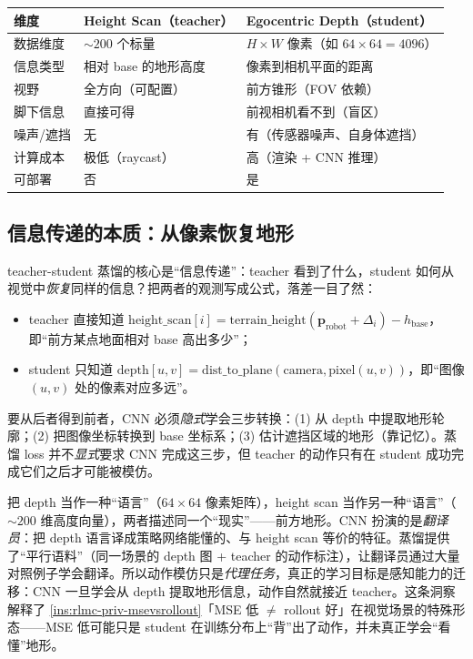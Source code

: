 \begin{center}
\small
\begin{tabular}{@{}lll@{}}
\toprule
维度 & Height Scan（teacher） & Egocentric Depth（student） \\
\midrule
数据维度 & $\sim 200$ 个标量 & $H\times W$ 像素（如 $64\times64=4096$） \\
信息类型 & 相对 base 的地形高度 & 像素到相机平面的距离 \\
视野 & 全方向（可配置） & 前方锥形（FOV 依赖） \\
脚下信息 & 直接可得 & 前视相机看不到（盲区） \\
噪声/遮挡 & 无 & 有（传感器噪声、自身体遮挡） \\
计算成本 & 极低（raycast） & 高（渲染 + CNN 推理） \\
可部署 & 否 & 是 \\
\bottomrule
\end{tabular}
\end{center}

\subsection{信息传递的本质：从像素恢复地形}
\label{sec:rlmc-vm-infotransfer}

teacher-student 蒸馏的核心是“信息传递”：teacher 看到了什么，student 如何从视觉中\emph{恢复}同样的信息？把两者的观测写成公式，落差一目了然：

\begin{itemize}
\item teacher 直接知道 $\text{height\_scan}[i] = \text{terrain\_height}(\mathbf{p}_{\text{robot}} + \Delta_i) - h_{\text{base}}$，即“前方某点地面相对 base 高出多少”；
\item student 只知道 $\text{depth}[u,v] = \text{dist\_to\_plane}(\text{camera}, \text{pixel}(u,v))$，即“图像 $(u,v)$ 处的像素对应多远”。
\end{itemize}

要从后者得到前者，CNN 必须\emph{隐式}学会三步转换：(1) 从 depth 中提取地形轮廓；(2) 把图像坐标转换到 base 坐标系；(3) 估计遮挡区域的地形（靠记忆）。蒸馏 loss 并不\emph{显式}要求 CNN 完成这三步，但 teacher 的动作只有在 student 成功完成它们之后才可能被模仿。

\begin{insight}\label{ins:rlmc-vm-perception}
把 depth 当作一种“语言”（$64\times64$ 像素矩阵），height scan 当作另一种“语言”（$\sim 200$ 维高度向量），两者描述同一个“现实”——前方地形。CNN 扮演的是\emph{翻译员}：把 depth 语言译成策略网络能懂的、与 height scan 等价的特征。蒸馏提供了“平行语料”（同一场景的 depth 图 + teacher 的动作标注），让翻译员通过大量对照例子学会翻译。所以动作模仿只是\emph{代理任务}，真正的学习目标是感知能力的迁移：CNN 一旦学会从 depth 提取地形信息，动作自然就接近 teacher。这条洞察解释了 \cref{ins:rlmc-priv-msevsrollout}「MSE 低 $\ne$ rollout 好」在视觉场景的特殊形态——MSE 低可能只是 student 在训练分布上“背”出了动作，并未真正学会“看懂”地形。
\end{insight}

